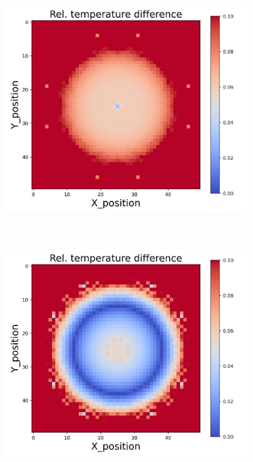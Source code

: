 \begin{figure}[h]
\begin{minipage}{\textwidth}
\begin{subfigure}{0.3\textwidth}
        \end{subfigure}
        \begin{subfigure}{0.3\textwidth}
            \centering
            \includegraphics[width=\textwidth]{figures/raw_data/21/lin_square/T_bias.jpg}
        \end{subfigure}
    \end{minipage}\\
    \begin{minipage}{\textwidth}
        \centering
        \begin{subfigure}{0.3\textwidth}
            \centering
            \includegraphics[width=\textwidth]{figures/raw_data/22/lin_square/T_bias.jpg}

\end{subfigure}
\end{minipage}
\end{figure}
